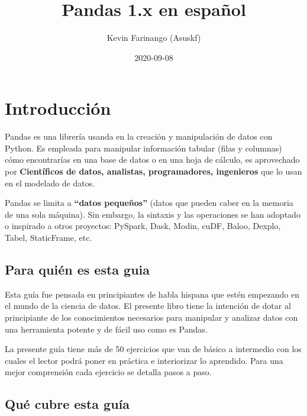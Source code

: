 \documentclass[
]{book}
\title{Pandas 1.x en español}
\author{Kevin Farinango (Asuskf)}
\date{2020-09-08}
\begin{document}
\maketitle

{
\setcounter{tocdepth}{1}
\tableofcontents
}
\hypertarget{introducciuxf3n}{%
\chapter{Introducción}\label{introducciuxf3n}}

Pandas es una librería usanda en la creación y manipulación de datos con Python. Es empleada para manipular información tabular (filas y columnas) cómo encontrarías en una base de datos o en una hoja de cálculo, es aprovechado por \textbf{Científicos de datos, analistas, programadores, ingenieros} que lo usan en el modelado de datos.

Pandas se limita a \textbf{``datos pequeños''} (datos que pueden caber en la memoria de una sola máquina). Sin embargo, la sintaxis y las operaciones se han adoptado o inspirado a otros proyectos: PySpark, Dask, Modin, cuDF, Baloo, Dexplo, Tabel, StaticFrame, etc.

\hypertarget{para-quiuxe9n-es-esta-guia}{%
\section{Para quién es esta guia}\label{para-quiuxe9n-es-esta-guia}}

Esta guía fue pensada en principiantes de habla hispana que estén empezando en el mundo de la ciencia de datos. El presente libro tiene la intención de dotar al principiante de los conocimientos necesarios para manipular y analizar datos con una herramienta potente y de fácil uso como es Pandas.

La presente guía tiene más de 50 ejercicios que van de básico a intermedio con los cuales el lector podrá poner en práctica e interiorizar lo aprendido. Para una mejor comprensión cada ejercicio se detalla pasos a paso.

\hypertarget{quuxe9-cubre-esta-guuxeda}{%
\section{Qué cubre esta guía}\label{quuxe9-cubre-esta-guuxeda}}
\end{document}
